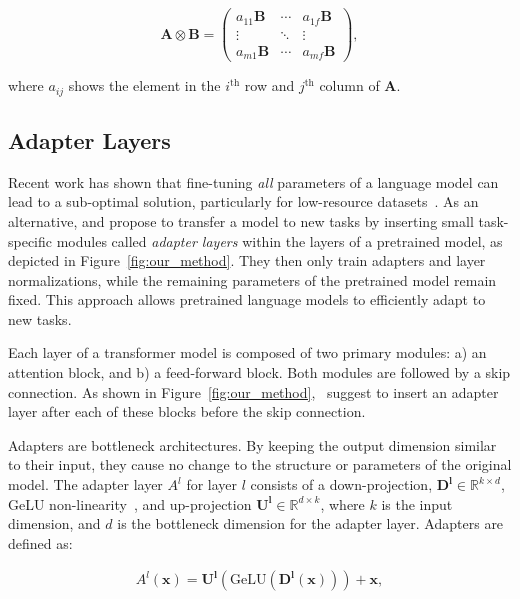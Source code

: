 \begin{equation}
\bm{A}\otimes\bm{B} =   \begin{pmatrix}
a_{11}\bm{B}  & \cdots & a_{1f}\bm{B} \\
\vdots  & \ddots & \vdots  \\
a_{m1}\bm{B}  & \cdots & a_{mf}\bm{B} 
\end{pmatrix},
\end{equation}

 where $a_{ij}$ shows the element in the $i^\text{th}$ row and $j^\text{th}$ column of $\bm{A}$. 
\subsection{Adapter Layers}\label{sec:adapters}
Recent work has shown that fine-tuning \emph{all} parameters of a language model can lead to a sub-optimal solution, particularly for low-resource datasets~\citep{peters-2019-tune}. As an alternative, \citet{rebuffi2018efficient} and \citet{houlsby2019parameter} propose to transfer a model to new tasks by inserting small task-specific modules called \emph{adapter layers} within the layers of a pretrained model, as depicted in Figure~\ref{fig:our_method}. They then only train adapters and layer normalizations, while the remaining parameters of the pretrained model remain fixed. This approach allows pretrained language models to efficiently adapt to new tasks. 

Each layer of a transformer model is composed of two primary modules: a) an attention block, and b) a feed-forward block. Both modules are followed by a skip connection. As shown in Figure~\ref{fig:our_method},~\citet{houlsby2019parameter} suggest to insert an adapter layer after each of these blocks before the skip connection. 

Adapters are bottleneck architectures. By keeping the output dimension similar to their input, they cause no change to the structure or parameters of the original model. The adapter layer $A^l$ for layer $l$ consists of a down-projection, $\bm{D^l}\in\mathbb{R}^{k\times d}$, GeLU non-linearity~\citep{hendrycks2016gaussian}, and up-projection $\bm{U^l} \in\mathbb{R}^{d \times k}$, where $k$ is the input dimension, and $d$ is the bottleneck dimension for the adapter layer. Adapters are defined as:

\begin{align}
A^l(\bm{x}) = \bm{U^l}(\text{GeLU}(\bm{D^l}(\bm{x}))) + \bm{x}, \label{eq:adapters}
\end{align}

